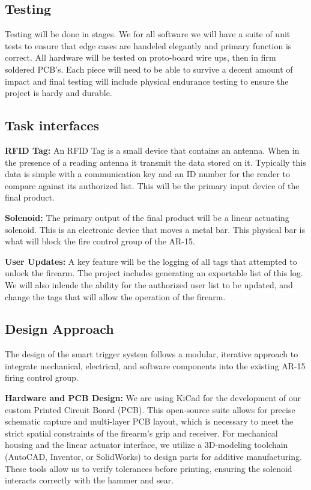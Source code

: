 \subsection{Testing}
Testing will be done in stages. We for all software we will have a suite of unit tests to ensure that
edge cases are handeled elegantly and primary function is correct. All hardware will be tested on proto-board
wire ups, then in firm soldered PCB's. Each piece will need to be able to survive a decent amount of impact and 
final testing will include physical endurance testing to ensure the project is hardy and durable.

\subsection{Task interfaces}
\textbf{RFID Tag:} An RFID Tag is a small device that contains an antenna. When in the presence of
a reading antenna it transmit the data stored on it. Typically this data is simple with a communication key
and an ID number for the reader to compare against its authorized list. This will be the primary input device 
of the final product.

\textbf{Solenoid:} The primary output of the final product will be a linear actuating solenoid. This is
an electronic device that moves a metal bar. This physical bar is what will block the fire control group 
of the AR-15.

\textbf{User Updates:} A key feature will be the logging of all tags that attempted to unlock the firearm.
The project includes generating an exportable list of this log. We will also inlcude the ability for the authorized
user list to be updated, and change the tags that will allow the operation of the firearm.

\subsection{Design Approach}
The design of the smart trigger system follows a modular, iterative approach to integrate mechanical, electrical, and software components into the existing AR-15 firing control group. 

\textbf{Hardware and PCB Design:} We are using KiCad for the development of our custom Printed Circuit Board (PCB). This open-source suite allows for precise schematic capture and multi-layer PCB layout, which is necessary to meet the strict spatial constraints of the firearm's grip and receiver. For mechanical housing and the linear actuator interface, we utilize a 3D-modeling toolchain (AutoCAD, Inventor, or SolidWorks) to design parts for additive manufacturing. These tools allow us to verify tolerances before printing, ensuring the solenoid interacts correctly with the hammer and sear.

